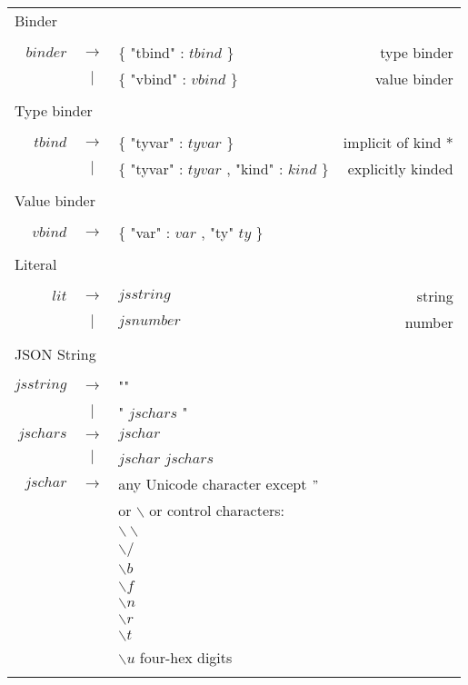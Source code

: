 \begin{footnotesize}
\begin{longtable}{ r c l r }
\multicolumn{4}{l}{Binder}			 \\
\\[0.01in]
$binder$	& $ \rightarrow $	& $\{$ "tbind" : $tbind$ $\}$											& type binder		\\
		& $ | $			& $\{$ "vbind" : $vbind$ $\}$											& value binder		\\
\\[0.01in]

\multicolumn{4}{l}{Type binder}			 \\
\\[0.01in]
$tbind$		& $ \rightarrow $	& $\{$ "tyvar" : $tyvar$ $\}$											& implicit of kind * 	\\
		& $ | $			& $\{$ "tyvar" : $tyvar$ , "kind" : $kind$ $\}$									& explicitly kinded	\\
\\[0.01in]

\multicolumn{4}{l}{Value binder}			 \\
\\[0.01in]
$vbind$		& $ \rightarrow $	& $\{$ "var" : $var$ , "ty" $ty$ $\}$ 										& \\
\\[0.01in]

\multicolumn{4}{l}{Literal}			 \\
\\[0.01in]
$lit$		& $ \rightarrow $	& $jsstring$													& string 		\\ 
		& $ | $			& $jsnumber$													& number		\\
\\[0.01in]

\multicolumn{4}{l}{JSON String}			 \\
\\[0.01in]
$jsstring$	& $ \rightarrow $	& ""														& \\
		& $ | $			& " $jschars$ "													& \\
$jschars$	& $ \rightarrow $	& $jschar$													& \\
		& $ | $			& $jschar$ $jschars$												& \\
$jschar$	& $ \rightarrow $	& any Unicode character except $"$ 										& \\ 
		&			& or $\backslash$ or control characters: 									& \\
		&			& $\backslash\backslash$											& \\
		&			& $\backslash /$ 												& \\
		&			& $\backslash b$ 												& \\
		& 			& $\backslash f$ 												& \\
		&			& $\backslash n$												& \\
		& 			& $\backslash r$ 												& \\
		&			& $\backslash t$ 												& \\
		& 			& $\backslash u$ four-hex digits\\
\\[0.01in]


\end{longtable}
\end{footnotesize}
